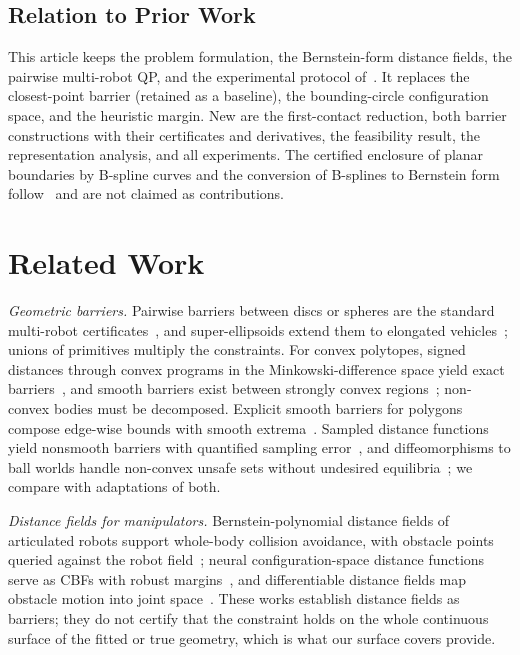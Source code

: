 \documentclass[journal]{IEEEtran}
\theoremstyle{definition}
\begin{document}
\subsection{Relation to Prior Work}\label{sec:relation}
This article keeps the problem formulation, the Bernstein-form distance fields, the pairwise
multi-robot QP, and the experimental protocol of~\cite{jo2026geometry}. It replaces the
closest-point barrier (retained as a baseline), the bounding-circle configuration space, and the
heuristic margin. New are the first-contact reduction, both barrier constructions with their
certificates and derivatives, the feasibility result, the representation analysis, and all
experiments. The certified enclosure of planar boundaries by B-spline curves and the conversion of
B-splines to Bernstein form follow~\cite{jo2027semantic} and are not claimed as contributions.

\section{Related Work}\label{sec:related}

\emph{Geometric barriers.} Pairwise barriers between discs or spheres are the standard multi-robot
certificates~\cite{wang2017safety}, and super-ellipsoids extend them to elongated
vehicles~\cite{wang2017quadrotors}; unions of primitives multiply the constraints. For convex
polytopes, signed distances through convex programs in the Minkowski-difference space yield exact
barriers~\cite{chen2025minkowski,chen2026exact}, and smooth barriers exist between strongly convex
regions~\cite{thirugnanam2025strongly}; non-convex bodies must be decomposed. Explicit smooth
barriers for polygons compose edge-wise bounds with smooth extrema~\cite{wu2025optimization}.
Sampled distance functions yield nonsmooth barriers with quantified sampling
error~\cite{lutkus2025sampling}, and diffeomorphisms to ball worlds handle non-convex unsafe sets
without undesired equilibria~\cite{notomista2021nonconvex}; we compare with adaptations of both.

\emph{Distance fields for manipulators.} Bernstein-polynomial distance fields of articulated robots
support whole-body collision avoidance, with obstacle points queried against the robot
field~\cite{li2024representing}; neural configuration-space distance functions serve as CBFs with
robust margins~\cite{long2025neural}, and differentiable distance fields map obstacle motion into
joint space~\cite{chi2024safe}. These works establish distance fields as barriers; they do not
certify that the constraint holds on the whole continuous surface of the fitted or true geometry,
which is what our surface covers provide.
\end{document}
